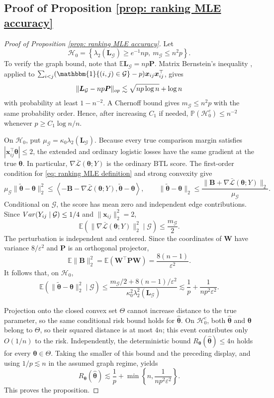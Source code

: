 \documentclass[letterpaper,12pt]{article}
\numberwithin{equation}{section}
\theoremstyle{plain}
\numberwithin{Theorem}{section}
\numberwithin{proposition}{section}
\numberwithin{Lemma}{section}
{
	\theoremstyle{definition}
	\newtheorem{Definition}{Definition}
	\newtheorem{example}{Example}
	\numberwithin{example}{section}
	\newtheorem{fact}{Fact}
	\numberwithin{fact}{section}
	\newtheorem{remark}{Remark}
}
\newcommand{\Pro}{\mathbb{P}}
\newcommand{\1}{\mathbbm{1}}
\def\bth{{\boldsymbol{\theta}}}
\def\Var{{\rm Var}}
\def\E{\mathbb{E}}
\begin{document}
{\subsection{Proof of Proposition \ref{prop: ranking MLE accuracy}}\label{sec: proof of prop: ranking MLE accuracy}
\begin{proof}[Proof of Proposition \ref{prop: ranking MLE accuracy}]
Let
\[
\mathcal H_0=\left\{\lambda_2(\bm L_{\mathcal G})\geq e^{-1}np,
\ m_{\mathcal G}\leq n^2p\right\}.
\]
To verify the graph bound, note that
$\E\bm L_{\mathcal G}=np\bm P$. Matrix Bernstein's inequality
\cite{tropp2015introduction}, applied to
$\sum_{i<j}(\1\{(i,j)\in\mathcal G\}-p)\bm x_{ij}\bm x_{ij}^\top$,
gives
\[
\|\bm L_{\mathcal G}-np\bm P\|_{\rm op}
\lesssim\sqrt{np\log n}+\log n
\]
with probability at least $1-n^{-2}$. A Chernoff bound gives
$m_{\mathcal G}\leq n^2p$ with the same probability order. Hence, after increasing
$C_1$ if needed, $\Pro(\mathcal H_0^c)\leq n^{-2}$ whenever
$p\geq C_1\log n/n$.

On $\mathcal H_0$, put $\mu_{\mathcal G}=\kappa_0\lambda_2(\bm L_{\mathcal G})$.
Because every true comparison margin satisfies
$|\bm x_{ij}^\top\bth|\leq2$, the extended and ordinary logistic losses have the same gradient at the true $\bth$. In particular,
$\nabla\bar{\mathcal L}(\bth;Y)$ is the ordinary BTL score.
The first-order condition for \eqref{eq: ranking MLE definition} and strong convexity give
\[
\mu_{\mathcal G}\|\widetilde\bth-\bth\|_2^2
\leq
\left\langle-\bm B-\nabla\bar{\mathcal L}(\bth;Y),
\widetilde\bth-\bth\right\rangle,
\qquad
\|\widetilde\bth-\bth\|_2
\leq\frac{\|\bm B+\nabla\bar{\mathcal L}(\bth;Y)\|_2}{\mu_{\mathcal G}}.
\]
Conditional on $\mathcal G$, the score has mean zero and independent edge contributions. Since
$\Var(Y_{ij}\mid\mathcal G)\leq1/4$ and $\|\bm x_{ij}\|_2^2=2$,
\[
\E\left(\|\nabla\bar{\mathcal L}(\bth;Y)\|_2^2\mid\mathcal G\right)
\leq\frac{m_{\mathcal G}}2.
\]
The perturbation is independent and centered. Since the coordinates of $\bm W$
have variance $8/\varepsilon^2$ and $\bm P$ is an orthogonal projector,
\[
\E\|\bm B\|_2^2
=\E(\bm W^\top\bm P\bm W)
=\frac{8(n-1)}{\varepsilon^2}.
\]
It follows that, on $\mathcal H_0$,
\[
\E(\|\widetilde\bth-\bth\|_2^2\mid\mathcal G)
\leq
\frac{m_{\mathcal G}/2+8(n-1)/\varepsilon^2}
{\kappa_0^2\lambda_2^2(\bm L_{\mathcal G})}
\lesssim\frac1p+\frac{1}{np^2\varepsilon^2}.
\]

Projection onto the closed convex set $\Theta$ cannot increase distance to the true parameter, so the same conditional risk bound holds for $\hat\bth$. On $\mathcal H_0^c$, both $\hat\bth$ and $\bth$ belong to $\Theta$, so their squared distance is at most $4n$; this event contributes only $O(1/n)$ to the risk. Independently, the deterministic bound $R_\bth(\hat\bth)\leq4n$ holds for every $\bth\in\Theta$. Taking the smaller of this bound and the preceding display, and using $1/p\lesssim n$ in the assumed graph regime, yields
\[
R_\bth(\hat\bth)
\lesssim\frac1p+\min\left\{n,\frac{1}{np^2\varepsilon^2}\right\}.
\]
This proves the proposition.
\end{proof}
}
\end{document}
